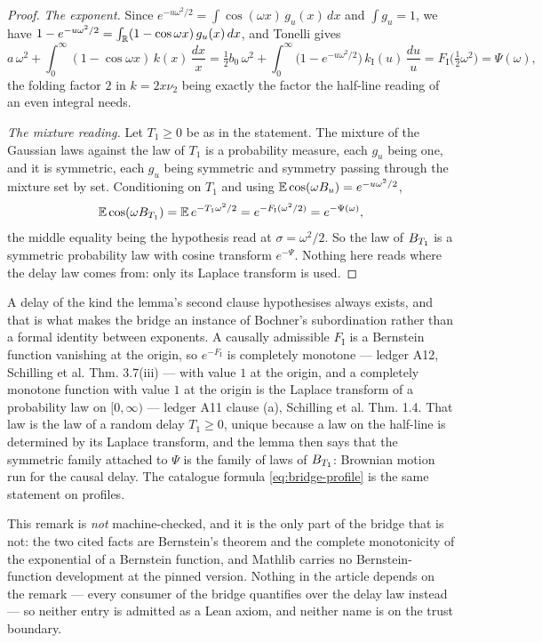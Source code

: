 \begin{proof}
\emph{The exponent.} Since $e^{-u\omega^2/2} = \int\cos(\omega x)\,g_u(x)\,dx$ and
$\int g_u = 1$, we have $1 - e^{-u\omega^2/2} = \int_{\mathbb{R}} (1 - \cos\omega x)\,g_u(x)\,dx$, and
Tonelli gives
\[
  a\,\omega^2 + \int_0^\infty (1 - \cos\omega x)\,k(x)\,\frac{dx}{x}
   = \tfrac12 b_0\,\omega^2
     + \int_0^\infty \bigl(1 - e^{-u\omega^2/2}\bigr)\,k_{\mathrm I}(u)\,\frac{du}{u}
   = F_{\mathrm I}\bigl(\tfrac12\omega^2\bigr) = \Psi(\omega),
\]
the folding factor $2$ in $k = 2x\nu_2$ being exactly the factor the half-line reading of an
even integral needs.

\emph{The mixture reading.} Let $T_1 \ge 0$ be as in the statement. The mixture of the Gaussian
laws against the law of $T_1$ is a probability measure, each $g_u$ being one, and it is
symmetric, each $g_u$ being symmetric and symmetry passing through the mixture set by set.
Conditioning on $T_1$ and using $\mathbb{E}\cos(\omega B_u) = e^{-u\omega^2/2}$,
\[
  \mathbb{E}\cos(\omega B_{T_1}) = \mathbb{E}\,e^{-T_1\omega^2/2}
   = e^{-F_{\mathrm I}(\omega^2/2)} = e^{-\Psi(\omega)},
\]
the middle equality being the hypothesis read at $\sigma = \omega^2/2$. So the law of $B_{T_1}$
is a symmetric probability law with cosine transform $e^{-\Psi}$. Nothing here reads where the
delay law comes from: only its Laplace transform is used.
\end{proof}

\begin{remark}\label{rem:bridge-subordination}
A delay of the kind the lemma's second clause hypothesises always exists, and that is what makes
the bridge an instance of Bochner's subordination rather than a formal identity between
exponents. A causally admissible $F_{\mathrm I}$ is a Bernstein function vanishing at the
origin, so $e^{-F_{\mathrm I}}$ is completely monotone --- ledger A12, Schilling et al.
Thm. 3.7(iii) --- with value $1$ at the origin, and a completely monotone function with value $1$
at the origin is the Laplace transform of a probability law on $[0,\infty)$ --- ledger A11
clause (a), Schilling et al. Thm. 1.4. That law is the law of a random delay
$T_1 \ge 0$, unique because a law on the half-line is determined by its Laplace transform, and
the lemma then says that the symmetric family attached to $\Psi$ is the family of laws of
$B_{T_1}$: Brownian motion run for the causal delay. The catalogue formula \ref{eq:bridge-profile}
is the same statement on profiles.

This remark is \emph{not} machine-checked, and it is the only part of the bridge that is not:
the two cited facts are Bernstein's theorem and the complete monotonicity of the exponential of
a Bernstein function, and Mathlib carries no Bernstein-function development at the pinned
version. Nothing in the article depends on the remark --- every consumer of the bridge quantifies
over the delay law instead --- so neither entry is admitted as a Lean axiom, and neither name is
on the trust boundary.
\end{remark}

